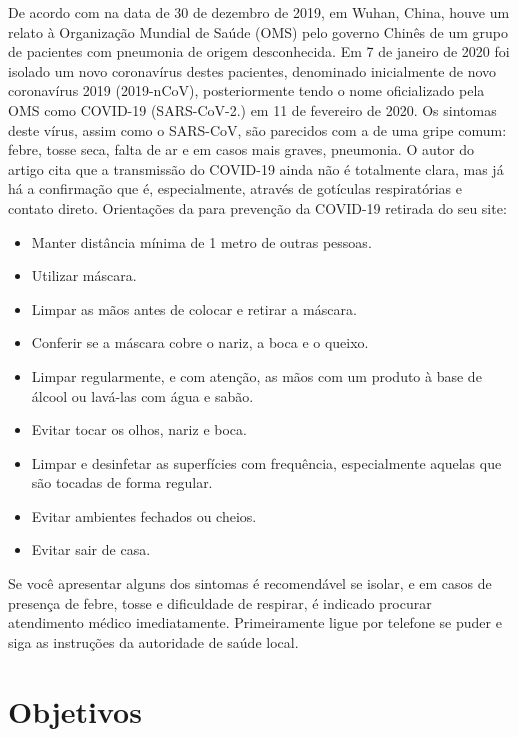 \documentclass[
  fleqn,ebook]{ic}
\providecommand{\tightlist}{%
  \setlength{\itemsep}{0pt}\setlength{\parskip}{0pt}}
\begin{document}
De acordo com \cite{guarner2020three} na data de 30 de dezembro de 2019, em
Wuhan, China, houve um relato à Organização Mundial de Saúde (OMS) pelo governo
Chinês de um grupo de pacientes com pneumonia de origem desconhecida. Em 7 de
janeiro de 2020 foi isolado um novo coronavírus destes pacientes, denominado
inicialmente de novo coronavírus 2019 (2019-nCoV), posteriormente tendo o nome
oficializado pela OMS como COVID-19 (SARS-CoV-2.) em 11 de fevereiro de 2020. Os
sintomas deste vírus, assim como o SARS-CoV, são parecidos com a de uma gripe
comum: febre, tosse seca, falta de ar e em casos mais graves, pneumonia. O autor
do artigo \cite{qing2020possibility} cita que a transmissão do COVID-19 ainda
não é totalmente clara, mas já há a confirmação que é, especialmente, através de
gotículas respiratórias e contato direto. Orientações da \cite{covid19OMS} para
prevenção da COVID-19 retirada do seu site:

\begin{itemize}
\tightlist
\item
  Manter distância mínima de 1 metro de outras pessoas.
\item
  Utilizar máscara.
\item
  Limpar as mãos antes de colocar e retirar a máscara.
\item
  Conferir se a máscara cobre o nariz, a boca e o queixo.
\item
  Limpar regularmente, e com atenção, as mãos com um produto à base de álcool ou
  lavá-las com água e sabão.
\item
  Evitar tocar os olhos, nariz e boca.
\item
  Limpar e desinfetar as superfícies com frequência, especialmente aquelas que
  são tocadas de forma regular.
\item
  Evitar ambientes fechados ou cheios.
\item
  Evitar sair de casa.
\end{itemize}

Se você apresentar alguns dos sintomas é recomendável se isolar, e em casos de
presença de febre, tosse e dificuldade de respirar, é indicado procurar
atendimento médico imediatamente. Primeiramente ligue por telefone se puder e
siga as instruções da autoridade de saúde local.

\hypertarget{objetivos}{%
\section{Objetivos}\label{objetivos}}
\end{document}

